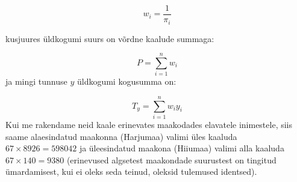 \documentclass[
]{book}
\begin{document}
\[w_i = \frac{1}{\pi_i}\]

kusjuures üldkogumi suurs on võrdne kaalude summaga:

\[P = \sum^{n}_{i = 1} w_i\]
ja mingi tunnuse \(y\) üldkogumi kogusumma on:

\[T_y = \sum^{n}_{i = 1}w_i y_i\]
Kui me rakendame neid kaale erinevates maakodades elavatele inimestele, siis saame alaesindatud maakonna (Harjumaa) valimi üles kaaluda \(67 \times 8926 = 598042\) ja üleesindatud maakona (Hiiumaa) valimi alla kaaluda \(67 \times 140 = 9380\) (erinevused algsetest maakondade suurustest on tingitud ümardamisest, kui ei oleks seda teinud, oleksid tulemused identsed).

\providecommand{\docline}[3]{\noalign{\global\setlength{\arrayrulewidth}{#1}}\arrayrulecolor[HTML]{#2}\cline{#3}}

\setlength{\tabcolsep}{2pt}

\renewcommand*{\arraystretch}{1.5}
\end{document}
